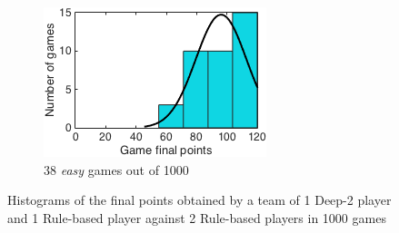 \begin{figure}[h]
\begin{subfigure}[h]{0.32\textwidth}
                \includegraphics[width=\textwidth]{./img/appendix/histHeasy}
                \caption{38 \emph{easy} games out of 1000}
                \label{app:histHeasy}
        \end{subfigure}
        \caption[Histograms of the final points obtained in scenario (h) for \emph{hard}, \emph{medium} and \emph{easy} hands]{Histograms of the final points obtained by a team of 1 Deep-2 player and 1 Rule-based player against 2 Rule-based players in 1000 games}
        \label{app:histogramsH}
\end{figure}


